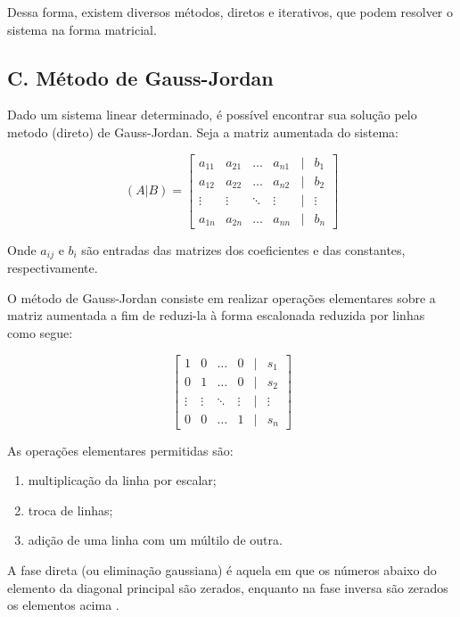 \documentclass[twocolumn, 10pt]{extarticle}
\begin{document}
Dessa forma, existem diversos métodos, diretos e iterativos, que podem resolver o sistema na forma matricial.

\subsection*{C. \quad Método de Gauss-Jordan}

Dado um sistema linear determinado, é possível encontrar sua solução pelo metodo (direto) de Gauss-Jordan. Seja a matriz aumentada do sistema:

\[ 
(A\vert B) = 
\begin{bmatrix}
a_{11} & a_{21} & \dots & a_{n1} & \vert & b_1 \\
a_{12} & a_{22} & \dots & a_{n2} & \vert & b_2 \\
\vdots & \vdots & \ddots & \vdots & \vert & \vdots \\
a_{1n} & a_{2n} & \dots & a_{nn} & \vert & b_n

\end{bmatrix}
\]

Onde $a_{ij}$ e $b_i$ são entradas das matrizes dos coeficientes e das constantes, respectivamente.

O método de Gauss-Jordan consiste em realizar operações elementares sobre a matriz aumentada a fim de reduzi-la à forma escalonada reduzida por linhas \cite[p. 15]{antonAlgebra} como segue:

\[ 
\begin{bmatrix}
1 & 0 & \dots & 0 & \vert & s_1 \\
0 & 1 & \dots & 0 & \vert & s_2 \\
\vdots & \vdots & \ddots & \vdots & \vert & \vdots \\
0 & 0 & \dots & 1 & \vert & s_n
\end{bmatrix}
\]

As operações elementares permitidas são:

\begin{enumerate}
    \item multiplicação da linha por escalar;
    \item troca de linhas;
    \item adição de uma linha com um múltilo de outra.
\end{enumerate}

A fase direta (ou eliminação gaussiana) é aquela em que os números abaixo do elemento da diagonal principal são zerados, enquanto na fase inversa são zerados os elementos acima \cite[p.15]{antonAlgebra}.
\end{document}
